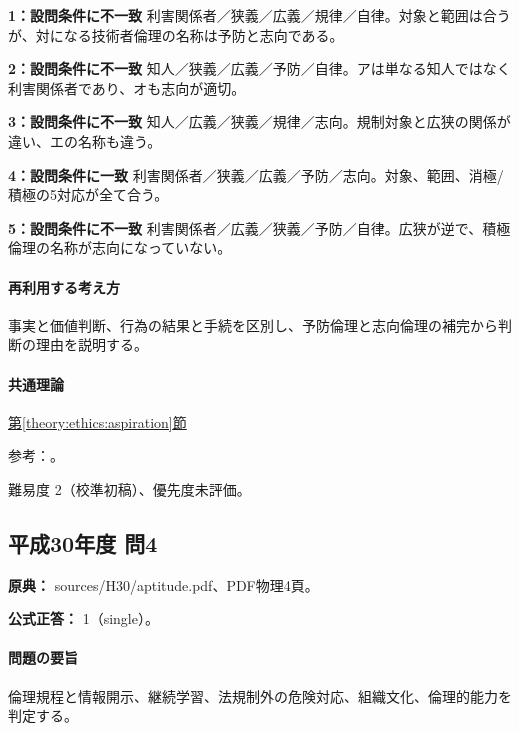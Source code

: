\noindent\textbf{1：設問条件に不一致} 利害関係者／狭義／広義／規律／自律。対象と範囲は合うが、対になる技術者倫理の名称は予防と志向である。\par

\noindent\textbf{2：設問条件に不一致} 知人／狭義／広義／予防／自律。アは単なる知人ではなく利害関係者であり、オも志向が適切。\par

\noindent\textbf{3：設問条件に不一致} 知人／広義／狭義／規律／志向。規制対象と広狭の関係が違い、エの名称も違う。\par

\noindent\textbf{4：設問条件に一致} 利害関係者／狭義／広義／予防／志向。対象、範囲、消極/積極の5対応が全て合う。\par

\noindent\textbf{5：設問条件に不一致} 利害関係者／広義／狭義／予防／自律。広狭が逆で、積極倫理の名称が志向になっていない。\par

\paragraph{再利用する考え方} 事実と価値判断、行為の結果と手続を区別し、予防倫理と志向倫理の補完から判断の理由を説明する。

\paragraph{共通理論} \hyperref[theory:ethics:aspiration]{第\ref*{theory:ethics:aspiration}節}

\par 参考：\cite{jinji_ethics2017,jinji_ethics_qa,fudano_ethics2021}。

\par 難易度 2（校準初稿）、優先度未評価。

\subsection{平成30年度 問4}
\label{q:h30-reg-apt-04}

\noindent\textbf{原典：} sources/H30/aptitude.pdf、PDF物理4頁。

\textbf{公式正答：} 1（single）。

\paragraph{問題の要旨} 倫理規程と情報開示、継続学習、法規制外の危険対応、組織文化、倫理的能力を判定する。

